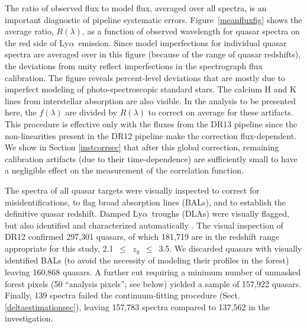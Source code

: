\documentclass{aa}
\newcommand{\Lya}{Ly$\alpha$~}
\begin{document}
The ratio of observed flux to model flux, averaged over all spectra,
is an important
diagnostic of pipeline systematic errors.
Figure~\ref{meanfluxfig} shows the average ratio, $R(\lambda)$,
as a function of observed wavelength for quasar spectra
on the red side of \Lya emission.
Since model imperfections for individual quasar spectra are
averaged over in this figure (because of the range of quasar redshifts),
the deviations from unity
reflect imperfections in the spectrograph flux calibration.
The figure reveals
percent-level deviations that are
mostly due to 
imperfect modeling of  photo-spectroscopic standard stars.
The calcium H and K lines from interstellar absorption are also visible.
In the analysis to be presented here,
the $f(\lambda)$ are  divided by $R(\lambda)$ to correct
on average for these artifacts.
This procedure is  effective only with the fluxes from the DR13 pipeline
since the non-linearities present in the DR12 pipeline make
the correction flux-dependent.
We show in Section \ref{instcorrsec} that after this global correction,
remaining calibration artifacts (due to their time-dependence) are
sufficiently small to have a negligible effect on the measurement
of the correlation function.


The spectra of all quasar targets were visually inspected
\citep{2012A&A...548A..66P,2014A&A...563A..54P,2016arXiv160806483P} 
to correct for misidentifications, to flag broad absorption lines (BALs),
and to  establish the definitive quasar redshift.
Damped \Lya troughs (DLAs)
were visually flagged, but also identified and characterized
automatically \citep{2012A&A...547L...1N}. 
The visual inspection of DR12 confirmed
297,301 quasars, of which 
181,719 are in the redshift range appropriate for
this study, 2.1~$\leq$~$z_q$~$\leq$~3.5. 
We discarded
quasars with visually identified BALs  (to avoid the necessity
of modeling their profiles in the forest)
leaving 160,868  quasars. 
A further cut requiring a minimum number of
unmasked forest pixels (50 ``analysis pixels''; see below) 
yielded a sample of 157,922 quasars.
Finally, 139 spectra failed the
continuum-fitting procedure (Sect. \ref{deltaestimationsec}),
leaving
157,783 spectra compared to 
137,562  in the \citet{2015A&A...574A..59D} investigation.
\end{document}
